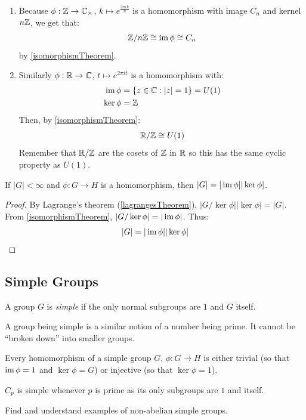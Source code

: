 \documentclass[../main.tex]{subfiles}
\begin{document}
\begin{example}
  \begin{enumerate}
    \item Because $\phi: \mathbb{Z} \to \mathbb{C}_\times$, $k \mapsto e^{\frac{2\pi i k}{n}}$ is a homomorphism with image $C_n$ and kernel $n\mathbb{Z}$, we get that:
      \[
        \mathbb{Z} / n\mathbb{Z} \cong \operatorname{im} \phi \cong C_n
      \]
    by \cref{isomorphismTheorem}.
  \item Similarly $\phi: \mathbb{R} \to \mathbb{C}$, $t \mapsto e^{2\pi i t}$ is a homomorphism with:
    \begin{align*}
      \operatorname{im} \phi &= \{z \in \mathbb{C}: |z| = 1\} = U(1) \\
      \ker \phi &= \mathbb{Z}
    \end{align*}
    Then, by \cref{isomorphismTheorem}:
    \[
      \mathbb{R} / \mathbb{Z} \cong U(1)
    \]
    Remember that $\mathbb{R} / \mathbb{Z}$ are the cosets of $\mathbb{Z}$ in $\mathbb{R}$ so this has the same cyclic property as $U(1)$.
  \end{enumerate}
\end{example}
\begin{corollary}
  If $|G| < \infty$ and $\phi: G \to H$ is a homomorphism, then $|G| = |\operatorname{im} \phi||\ker \phi|$. \label{firstIsomorphismCorollary}
\end{corollary}
\begin{proof}
  By Lagrange's theorem (\cref{lagrangesTheorem}), $|G / \ker \phi||\ker \phi| = |G|$.
  From \cref{isomorphismTheorem}, $|G / \ker \phi| = |\operatorname{im} \phi|$.
  Thus:
  \[
    |G| = |\operatorname{im} \phi||\ker \phi|
  \]
\end{proof}
\subsection{Simple Groups}
\begin{definition}
  A group $G$ is \textit{simple} if the only normal subgroups are $1$ and $G$ itself.
\end{definition}
\begin{remark}
  A group being simple is a similar notion of a number being prime.
  It cannot be ``broken down'' into smaller groups.
\end{remark}
Every homomorphism of a simple group $G$, $\phi: G \to H$ is either trivial (so that $\operatorname{im} \phi = 1$ and $\ker \phi = G$) or injective (so that $\ker \phi = 1$).
\begin{example}
  $C_p$ is simple whenever $p$ is prime as its only subgroups are $1$ and itself.
\end{example}
\begin{remark}[Challenge]
  Find and understand examples of non-abelian simple groups.
\end{remark}
\end{document}
